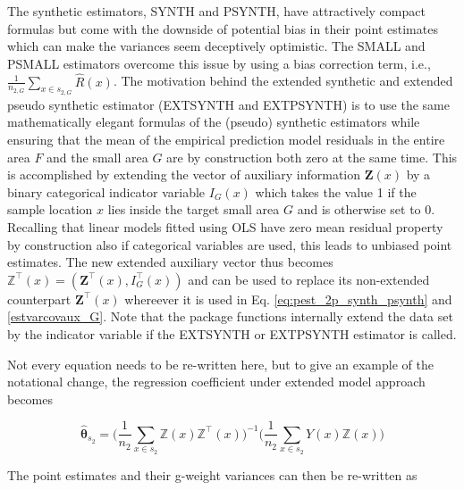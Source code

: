 The synthetic estimators, SYNTH and PSYNTH, have attractively compact formulas but come with the downside of potential bias in their point estimates which can make the variances seem deceptively optimistic. The SMALL and PSMALL estimators overcome this issue by using a bias correction term, i.e., $\frac{1}{n_{2,G}}\sum_{x \in s_{2,G}}\hat{R}(x)$. The motivation behind the extended synthetic and extended pseudo synthetic estimator (EXTSYNTH and EXTPSYNTH) is to use the same mathematically elegant formulas of the (pseudo) synthetic estimators while ensuring that the mean of the empirical prediction model residuals in the entire area $F$ and the small area $G$ are by construction both zero at the same time. This is accomplished by extending the vector of auxiliary information $\pmb{Z}(x)$ by a binary categorical indicator variable $I_G(x)$ which takes the value 1 if the sample location $x$ lies inside the target small area $G$ and is otherwise set to 0. Recalling that linear models fitted using OLS have zero mean residual property by construction also if categorical variables are used, this leads to unbiased point estimates. The new extended auxiliary vector thus becomes $\pmb{\mathbb{Z}}^{\top}(x)=(\pmb{Z}^{\top}(x),I^{\top}_G(x))$ and can be used to replace its non-extended counterpart $\pmb{Z}^{\top}(x)$ whereever it is used in Eq. \ref{eq:pest_2p_synth_psynth} and \ref{estvarcovaux_G}. Note that the package functions internally extend the data set by the indicator variable if the EXTSYNTH or EXTPSYNTH estimator is called.

Not every equation needs to be re-written here, but to give an example of the notational change, the regression coefficient under extended model approach becomes

\begin{equation}\label{ext_normequ_simple}
  \hat{\pmb{\theta}}_{s_2}=\Big(\frac{1}{n_2}\sum_{x\in{s_2}}\pmb{\mathbb{Z}}(x)\pmb{\mathbb{Z}}^{\top}(x) \Big)^{-1} \Big(\frac{1}{n_2}\sum_{x\in{s_2}}Y(x)\pmb{\mathbb{Z}}(x)\Big)
\end{equation}

The point estimates and their g-weight variances can then be re-written as

